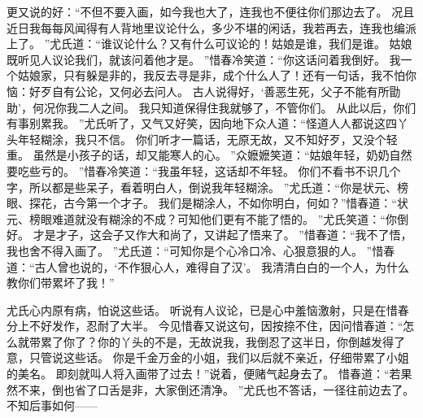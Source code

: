 更又说的好：“不但不要入画，如今我也大了，连我也不便往你们那边去了。
况且近日我每每风闻得有人背地里议论什么，多少不堪的闲话，我若再去，连我也编派上了。
”尤氏道：“谁议论什么？又有什么可议论的！姑娘是谁，我们是谁。
姑娘既听见人议论我们，就该问着他才是。
”惜春冷笑道：“你这话问着我倒好。
我一个姑娘家，只有躲是非的，我反去寻是非，成个什么人了！还有一句话，我不怕你恼：好歹自有公论，又何必去问人。
古人说得好，‘善恶生死，父子不能有所勖助’，何况你我二人之间。
我只知道保得住我就够了，不管你们。
从此以后，你们有事别累我。
”尤氏听了，又气又好笑，因向地下众人道：“怪道人人都说这四丫头年轻糊涂，我只不信。
你们听才一篇话，无原无故，又不知好歹，又没个轻重。
虽然是小孩子的话，却又能寒人的心。
”众嬷嬷笑道：“姑娘年轻，奶奶自然要吃些亏的。
”惜春冷笑道：“我虽年轻，这话却不年轻。
你们不看书不识几个字，所以都是些呆子，看着明白人，倒说我年轻糊涂。
”尤氏道：“你是状元、榜眼、探花，古今第一个才子。
我们是糊涂人，不如你明白，何如？”惜春道：“状元、榜眼难道就没有糊涂的不成？可知他们更有不能了悟的。
”尤氏笑道：“你倒好。
才是才子，这会子又作大和尚了，又讲起了悟来了。
”惜春道：“我不了悟，我也舍不得入画了。
”尤氏道：“可知你是个心冷口冷、心狠意狠的人。
”惜春道：“古人曾也说的，‘不作狠心人，难得自了汉’。
我清清白白的一个人，为什么教你们带累坏了我！”\par
尤氏心内原有病，怕说这些话。
听说有人议论，已是心中羞恼激射，只是在惜春分上不好发作，忍耐了大半。
今见惜春又说这句，因按捺不住，因问惜春道：“怎么就带累了你了？你的丫头的不是，无故说我，我倒忍了这半日，你倒越发得了意，只管说这些话。
你是千金万金的小姐，我们以后就不亲近，仔细带累了小姐的美名。
即刻就叫人将入画带了过去！”说着，便赌气起身去了。
惜春道：“若果然不来，倒也省了口舌是非，大家倒还清净。
”尤氏也不答话，一径往前边去了。
不知后事如何——\par
{}
